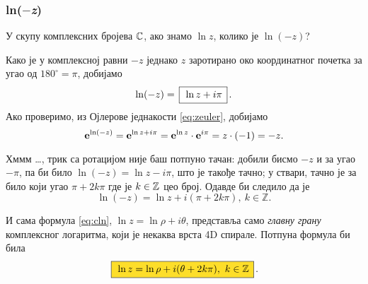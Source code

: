 \subsubsection[ln(-z)]{ln($-$\textit{z})}

\zadatak 
У скупу комплексних бројева ${\mathbb C}$, ако знамо $\ln z$,
колико је $\ln(-z)$?

\resenje 
Како је у комплексној равни $-z$ једнако $z$ заротирано
око координатног почетка
за угао од $180^\circ=\pi$, добијамо
$$
\ln (-z) = \ram{\ln z +i\pi}.
$$ 
Ако проверимо, из Ојлерове једнакости \eqref{eq:zeuler}, добијамо
$$
{\bf e}^{\ln(-z)} = {\bf e}^{\ln z+i\pi} = {\bf e}^{\ln z}\cdot {\bf e}^{i\pi}=z \cdot (-1)=-z.
$$

\dodatak Хммм \dots, трик са ротацијом није баш потпуно тачан: добили бисмо $-z$ и за угао $-\pi$,
па би било $\ln(-z)=\ln z-i\pi$, што је такође тачно;
у ствари, тачно је за било који угао $\pi+2k\pi$ где је $k\in{\mathbb Z}$ цео број. Одавде би следило да је
$$
\ln(-z) = \ln z + i(\pi+2k\pi),\ k\in{\mathbb Z}.
$$

И сама формула \eqref{eq:cln}, $\ln z=\ln\rho + i\theta$, представља само {\sl главну грану\/}
комплексног логаритма, који је некаква врста 4D спирале. Потпуна формула би била
\begin{equation}
    \okvir{\ln z=\ln\rho + i(\theta + 2k\pi),\ k\in\Zset} .
\end{equation}